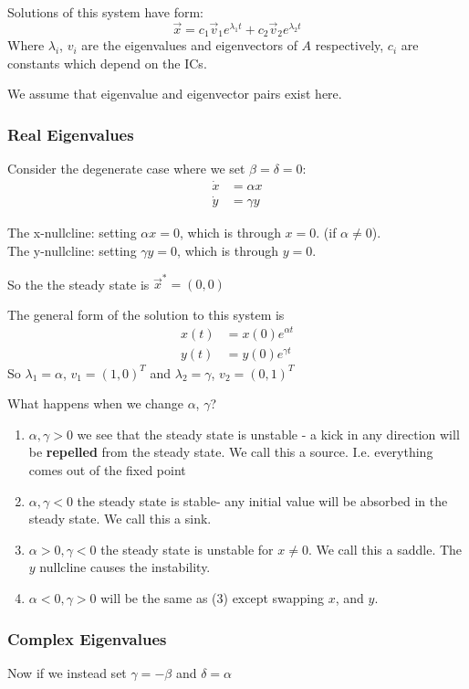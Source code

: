 \documentclass{/home/janmebows/Documents/LatexTemplates/myassignment}
\begin{document}
Solutions of this system have form:
\[\vec x = c_1 \vec v_1 e^{\lambda_1 t} + c_2 \vec v_2 e^{\lambda_2 t}\]
Where $\lambda_i$, $v_i$ are the eigenvalues and eigenvectors of $A$ respectively, $c_i$ are constants which depend on the ICs.

We assume that eigenvalue and eigenvector pairs exist here.

\subsubsection{Real Eigenvalues}
Consider the degenerate case where we set $\beta = \delta = 0$:
\begin{align*}
    \dot x &= \alpha x\\
    \dot y &= \gamma y
\end{align*}

The x-nullcline: setting $\alpha x = 0$, which is through $x=0$. (if $\alpha\neq 0$).\\
The y-nullcline: setting $\gamma y = 0$, which is through $y=0$.

So the the steady state is $\vec x^* = (0,0)$

The general form of the solution to this system is
\begin{align*}
    x(t) &= x(0) e^{\alpha t}\\
    y(t) &= y(0) e^{\gamma t}
\end{align*}
So $\lambda_1 = \alpha$, $v_1 = (1,0)^T$ and $\lambda_2 = \gamma$, $v_2 = (0,1)^T$


What happens when we change $\alpha$, $\gamma$?
\begin{enumerate}
    \item $\alpha,\gamma >0$ we see that the steady state is unstable - a kick in any direction will be \textbf{repelled} from the steady state. We call this a source. I.e. everything comes out of the fixed point
    \item $\alpha,\gamma <0$ the steady state is stable- any initial value will be absorbed in the steady state. We call this a sink.
    \item $\alpha > 0, \gamma <0$ the steady state is unstable for $x\neq 0$. We call this a saddle. The $y$ nullcline causes the instability.
    \item $\alpha <0, \gamma >0$ will be the same as (3) except swapping $x$, and $y$.
\end{enumerate}

\subsubsection{Complex Eigenvalues}
Now if we instead set $\gamma = -\beta$ and $\delta = \alpha$
\end{document}
